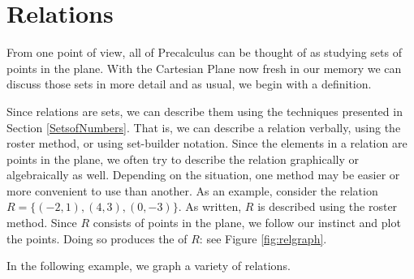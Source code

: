 \section{Relations}
\label{Relations}

From one point of view, all of Precalculus can be thought of as studying sets of points in the plane.  With the Cartesian Plane now fresh in our memory we can discuss those sets in more detail and as usual, we begin with a definition.

\medskip




\medskip

Since relations are sets, we can describe them using the techniques presented in Section \ref{SetsofNumbers}.  That is, we can describe a relation verbally, using the roster method, or using set-builder notation. Since the elements in a relation are points in the plane, we often try to describe the relation graphically or algebraically as well.  Depending on the situation, one method may be easier or more convenient to use than another.  As an example, consider the relation $R = \{ (-2,1),(4,3), (0,-3) \}$.  As written, $R$ is described using the roster method.  Since $R$ consists of points in the plane, we follow our instinct and plot the points.  Doing so produces the    of $R$: see Figure \ref{fig:relgraph}.


In the following example, we graph a variety of relations.


